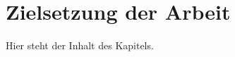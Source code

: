 \section{Zielsetzung der Arbeit}
\label{sec:01-02_research-goals-and-relevance}

Hier steht der Inhalt des Kapitels.